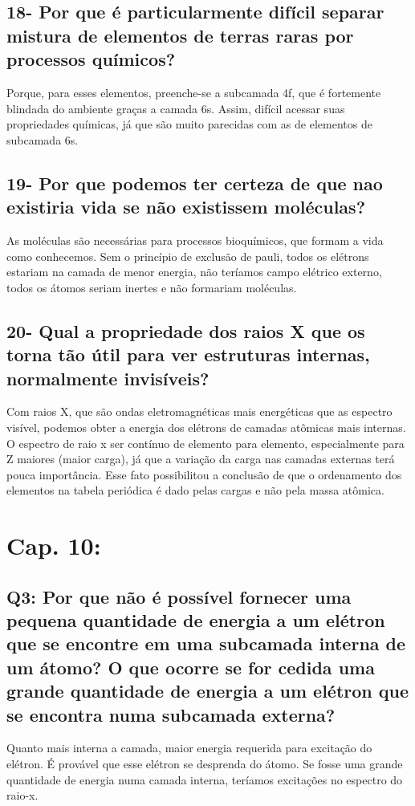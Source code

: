 \documentclass{article}
\begin{document}
\subsection{18- Por que é particularmente difícil separar mistura de elementos de terras raras por processos químicos?}

Porque, para esses elementos, preenche-se a subcamada 4f, que é fortemente blindada do ambiente graças a camada 6s. Assim, difícil acessar suas propriedades químicas, já que são muito parecidas com as de elementos de subcamada 6s.

\subsection{19- Por que podemos ter certeza de que nao existiria vida se não existissem moléculas?}

As moléculas são necessárias para processos bioquímicos, que formam a vida como conhecemos. Sem o princípio de exclusão de pauli, todos os elétrons estariam na camada de menor energia, não teríamos campo elétrico externo, todos os átomos seriam inertes e não formariam moléculas.

\subsection{20- Qual a propriedade dos raios X que os torna tão útil para ver estruturas internas, normalmente invisíveis?}

Com raios X, que são ondas eletromagnéticas mais energéticas que as espectro visível, podemos obter a energia dos elétrons de camadas atômicas mais internas.
O espectro de raio x ser contínuo de elemento para elemento, especialmente para Z maiores (maior carga), já que a variação da carga nas camadas externas terá pouca importância. Esse fato possibilitou a conclusão de que o ordenamento dos elementos na tabela periódica é dado pelas cargas e não pela massa atômica.

\pagebreak

\section{Cap. 10:}
\subsection{Q3: Por que não é possível fornecer uma pequena quantidade de energia a um elétron que se encontre em uma subcamada interna de um átomo? O que ocorre se for cedida uma grande quantidade de energia a um elétron que se encontra numa subcamada externa?}
Quanto mais interna a camada, maior energia requerida para excitação do elétron. É provável que esse elétron se desprenda do átomo. Se fosse uma grande quantidade de energia numa camada interna, teríamos excitações no espectro do raio-x.
\end{document}
